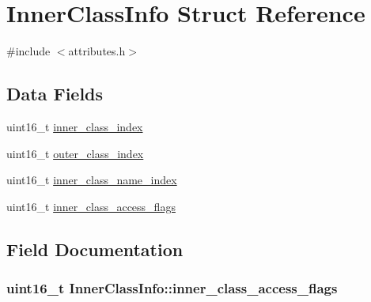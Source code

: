 \hypertarget{structInnerClassInfo}{}\section{Inner\+Class\+Info Struct Reference}
\label{structInnerClassInfo}


{\ttfamily \#include $<$attributes.\+h$>$}

\subsection*{Data Fields}
\begin{DoxyCompactItemize}
\item 
uint16\+\_\+t \hyperlink{structInnerClassInfo_a3383bc5bea2999b6bd91b9dfc095264f}{inner\+\_\+class\+\_\+index}
\item 
uint16\+\_\+t \hyperlink{structInnerClassInfo_a8449c27dc3cac6e437f4e1c1132ea229}{outer\+\_\+class\+\_\+index}
\item 
uint16\+\_\+t \hyperlink{structInnerClassInfo_a6d008047cb2df8aa856666169f625026}{inner\+\_\+class\+\_\+name\+\_\+index}
\item 
uint16\+\_\+t \hyperlink{structInnerClassInfo_a3810439736cc7ad5cdd1d2cb7aa7c885}{inner\+\_\+class\+\_\+access\+\_\+flags}
\end{DoxyCompactItemize}


\subsection{Field Documentation}
\subsubsection[{\texorpdfstring{inner\+\_\+class\+\_\+access\+\_\+flags}{inner_class_access_flags}}]{\setlength{\rightskip}{0pt plus 5cm}uint16\+\_\+t Inner\+Class\+Info\+::inner\+\_\+class\+\_\+access\+\_\+flags}\hypertarget{structInnerClassInfo_a3810439736cc7ad5cdd1d2cb7aa7c885}{}\label{structInnerClassInfo_a3810439736cc7ad5cdd1d2cb7aa7c885}
